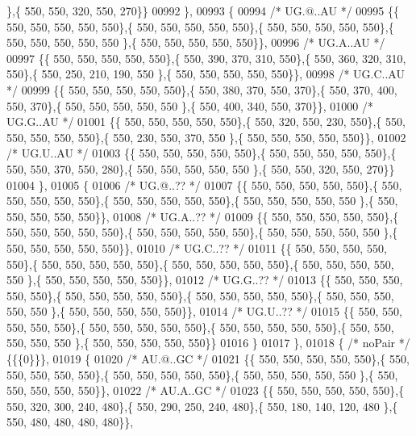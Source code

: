 \begin{DoxyCode}
      \},\{ 550, 550, 320, 550, 270\}\}
00992 \},
00993 \{
00994 \textcolor{comment}{/* UG.@..AU */}
00995 \{\{ 550, 550, 550, 550, 550\},\{ 550, 550, 550, 550, 550\},\{ 550, 550, 550, 550, 550\},\{ 550, 550, 550, 550, 550
      \},\{ 550, 550, 550, 550, 550\}\},
00996 \textcolor{comment}{/* UG.A..AU */}
00997 \{\{ 550, 550, 550, 550, 550\},\{ 550, 390, 370, 310, 550\},\{ 550, 360, 320, 310, 550\},\{ 550, 250, 210, 190, 550
      \},\{ 550, 550, 550, 550, 550\}\},
00998 \textcolor{comment}{/* UG.C..AU */}
00999 \{\{ 550, 550, 550, 550, 550\},\{ 550, 380, 370, 550, 370\},\{ 550, 370, 400, 550, 370\},\{ 550, 550, 550, 550, 550
      \},\{ 550, 400, 340, 550, 370\}\},
01000 \textcolor{comment}{/* UG.G..AU */}
01001 \{\{ 550, 550, 550, 550, 550\},\{ 550, 320, 550, 230, 550\},\{ 550, 550, 550, 550, 550\},\{ 550, 230, 550, 370, 550
      \},\{ 550, 550, 550, 550, 550\}\},
01002 \textcolor{comment}{/* UG.U..AU */}
01003 \{\{ 550, 550, 550, 550, 550\},\{ 550, 550, 550, 550, 550\},\{ 550, 550, 370, 550, 280\},\{ 550, 550, 550, 550, 550
      \},\{ 550, 550, 320, 550, 270\}\}
01004 \},
01005 \{
01006 \textcolor{comment}{/* UG.@..?? */}
01007 \{\{ 550, 550, 550, 550, 550\},\{ 550, 550, 550, 550, 550\},\{ 550, 550, 550, 550, 550\},\{ 550, 550, 550, 550, 550
      \},\{ 550, 550, 550, 550, 550\}\},
01008 \textcolor{comment}{/* UG.A..?? */}
01009 \{\{ 550, 550, 550, 550, 550\},\{ 550, 550, 550, 550, 550\},\{ 550, 550, 550, 550, 550\},\{ 550, 550, 550, 550, 550
      \},\{ 550, 550, 550, 550, 550\}\},
01010 \textcolor{comment}{/* UG.C..?? */}
01011 \{\{ 550, 550, 550, 550, 550\},\{ 550, 550, 550, 550, 550\},\{ 550, 550, 550, 550, 550\},\{ 550, 550, 550, 550, 550
      \},\{ 550, 550, 550, 550, 550\}\},
01012 \textcolor{comment}{/* UG.G..?? */}
01013 \{\{ 550, 550, 550, 550, 550\},\{ 550, 550, 550, 550, 550\},\{ 550, 550, 550, 550, 550\},\{ 550, 550, 550, 550, 550
      \},\{ 550, 550, 550, 550, 550\}\},
01014 \textcolor{comment}{/* UG.U..?? */}
01015 \{\{ 550, 550, 550, 550, 550\},\{ 550, 550, 550, 550, 550\},\{ 550, 550, 550, 550, 550\},\{ 550, 550, 550, 550, 550
      \},\{ 550, 550, 550, 550, 550\}\}
01016 \}
01017 \},
01018 \{ \textcolor{comment}{/* noPair */} \{\{\{0\}\}\},
01019 \{
01020 \textcolor{comment}{/* AU.@..GC */}
01021 \{\{ 550, 550, 550, 550, 550\},\{ 550, 550, 550, 550, 550\},\{ 550, 550, 550, 550, 550\},\{ 550, 550, 550, 550, 550
      \},\{ 550, 550, 550, 550, 550\}\},
01022 \textcolor{comment}{/* AU.A..GC */}
01023 \{\{ 550, 550, 550, 550, 550\},\{ 550, 320, 300, 240, 480\},\{ 550, 290, 250, 240, 480\},\{ 550, 180, 140, 120, 480
      \},\{ 550, 480, 480, 480, 480\}\},

\end{DoxyCode}
